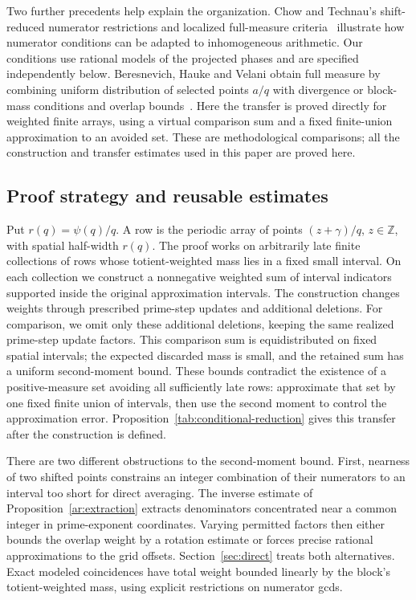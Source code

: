 Two further precedents help explain the organization. Chow and
Technau's shift-reduced numerator restrictions and localized full-measure
criteria~\cite[Definition~1.20 and Section~2.4]{ChowTechnau2024}
illustrate how numerator conditions can be adapted to inhomogeneous
arithmetic. Our conditions use rational models of the projected
phases and are specified independently below. Beresnevich, Hauke and
Velani obtain full measure by combining uniform distribution of selected
points $a/q$ with divergence or block-mass conditions and overlap
bounds~\cite[Theorems~11--12]{BHV2024}. Here the
transfer is proved directly for weighted finite arrays, using a
virtual comparison sum and a fixed finite-union approximation to an
avoided set. These are methodological comparisons; all the
construction and transfer estimates used in this paper are proved
here.

\subsection{Proof strategy and reusable estimates}

Put $r(q)=\psi(q)/q$. A row is the periodic array of points
$(z+\gamma)/q$, $z\in\mathbb Z$, with spatial half-width $r(q)$.
The proof works on arbitrarily late finite collections of rows whose
totient-weighted mass lies in a fixed small interval. On each collection
we construct a nonnegative weighted sum of interval indicators supported
inside the original approximation intervals. The construction changes
weights through prescribed prime-step updates and additional deletions.
For comparison, we omit only these additional deletions, keeping the
same realized prime-step update factors. This comparison sum is
equidistributed on fixed spatial
intervals; the expected discarded mass is small, and the retained sum
has a uniform second-moment bound. These bounds contradict the existence
of a positive-measure set avoiding all sufficiently late rows: approximate
that set by one fixed finite union of intervals, then use the second
moment to control the approximation error. Proposition~\ref{tab:conditional-reduction}
gives this transfer after the construction is defined.

There are two different obstructions to the second-moment bound. First,
nearness of two shifted points constrains an integer combination of
their numerators to an interval too short for direct averaging. The
inverse estimate of Proposition~\ref{ar:extraction} extracts denominators
concentrated near a common integer in prime-exponent coordinates.
Varying permitted factors then either bounds the overlap weight by a
rotation estimate or forces precise rational approximations to the grid
offsets. Section~\ref{sec:direct} treats both alternatives. Exact modeled
coincidences have total weight bounded linearly by the block's
totient-weighted mass, using explicit restrictions on numerator gcds.

